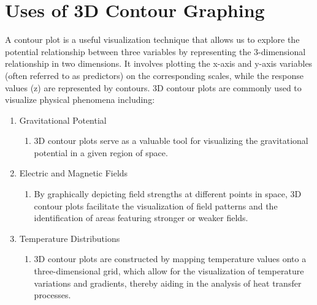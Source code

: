 \documentclass[
11pt, %
a4paper, %
oneside, %
headinclude,footinclude, %
BCOR5mm, %
]{scrartcl}
\begin{document}



\newpage %


\section{Uses of 3D Contour Graphing}
A contour plot is a useful visualization technique that allows us to explore the potential relationship between three variables by representing the 3-dimensional relationship in two dimensions. It involves plotting the x-axis and y-axis variables (often referred to as predictors) on the corresponding scales, while the response values (z) are represented by contours.\cite{Minitab}
\newline
\newline
3D contour plots are commonly used to visualize physical phenomena including:

\begin{enumerate}
	\item Gravitational Potential
	\begin{enumerate}
		\item[] 3D contour plots serve as a valuable tool for visualizing the gravitational potential in a given region of space.
	\end{enumerate}
	\item Electric and Magnetic Fields
	\begin{enumerate}
		\item[] By graphically depicting field strengths at different points in space, 3D contour plots facilitate the visualization of field patterns and the identification of areas featuring stronger or weaker fields.
	\end{enumerate}
	\item Temperature Distributions
	\begin{enumerate}
		\item[] 3D contour plots are constructed by mapping temperature values onto a three-dimensional grid, which allow for the visualization of temperature variations and gradients, thereby aiding in the analysis of heat transfer processes.
	\end{enumerate}
\end{enumerate}
\end{document}
